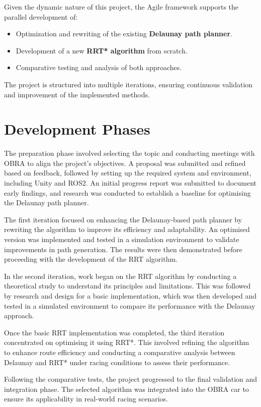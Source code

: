 \documentclass[a4paper,11pt]{report}
\begin{document}
Given the dynamic nature of this project, the Agile framework supports the parallel development of:
\begin{itemize}
    \item Optimization and rewriting of the existing \textbf{Delaunay path planner}.
    \item Development of a new \textbf{RRT* algorithm} from scratch.
    \item Comparative testing and analysis of both approaches.
\end{itemize}

The project is structured into multiple iterations, ensuring continuous validation and improvement of the implemented methods.

\section{Development Phases}
The preparation phase involved selecting the topic and conducting meetings with OBRA to align the project's objectives. A proposal was submitted and refined based on feedback, followed by setting up the required system and environment, including Unity and ROS2. An initial progress report was submitted to document early findings, and research was conducted to establish a baseline for optimising the Delaunay path planner.

The first iteration focused on enhancing the Delaunay-based path planner by rewriting the algorithm to improve its efficiency and adaptability. An optimised version was implemented and tested in a simulation environment to validate improvements in path generation. The results were then demonstrated before proceeding with the development of the RRT algorithm.

In the second iteration, work began on the RRT algorithm by conducting a theoretical study to understand its principles and limitations. This was followed by research and design for a basic implementation, which was then developed and tested in a simulated environment to compare its performance with the Delaunay approach.

Once the basic RRT implementation was completed, the third iteration concentrated on optimising it using RRT*. This involved refining the algorithm to enhance route efficiency and conducting a comparative analysis between Delaunay and RRT* under racing conditions to assess their performance.

Following the comparative tests, the project progressed to the final validation and integration phase. The selected algorithm was integrated into the OBRA car to ensure its applicability in real-world racing scenarios.
\end{document}
